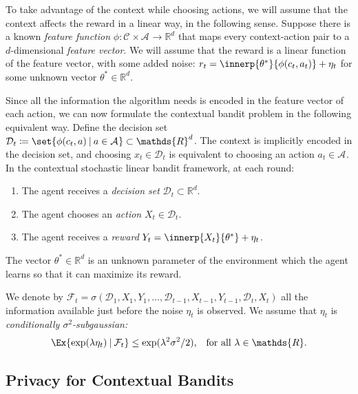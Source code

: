 \documentclass{article}
\newcommand{\defeq}{\coloneq}
\newcommand{\Real}{\mathds{R}}
\newcommand\given[1][\delimsize]{%
  \providecommand{\delimsize}{}
  \nonscript\:#1\vert\allowbreak\nonscript\:\mathopen{}
}
\newcommand{\Aset}[1]{\mathcal{A}_{#1}}
\newcommand{\Dset}[1]{\mathcal{D}_{#1}}
\newcommand{\Cset}[1]{\mathcal{C}_{#1}}
\begin{document}
To take advantage of the context while choosing actions, we will
assume that the context affects the reward in a linear way, in the
following sense.  Suppose there is a known \emph{feature function}
$\phi:\Cset{}\times\Aset{}\to\Real^d$ that maps every context-action
pair to a $d$-dimensional \emph{feature vector}.  We will assume that
the reward is a linear function of the feature vector, with some added
noise: $r_t = \innerp{\theta^*}{\phi(c_t,a_t)} + \eta_t$ for some
unknown vector $\theta^*\in\Real^d$.

Since all the information the algorithm needs is encoded in the
feature vector of each action, we can now formulate the contextual
bandit problem in the following equivalent way.  Define the decision
set
$\Dset{t} \defeq \set{\phi(c_t,a)\given a\in\Aset{}} \subset \Real^d$.
The context is implicitly encoded in the decision set, and choosing
$x_t\in\Dset{t}$ is equivalent to choosing an action $a_t\in\Aset{}$.
In the contextual stochastic linear bandit framework, at each round:
\begin{enumerate}
\item The agent receives a \emph{decision set} $\mathcal{D}_t \subset
  \Real^d$.
\item The agent chooses an \emph{action} $X_t \in \mathcal{D}_t$.
\item The agent receives a \emph{reward} $Y_t = \innerp{X_t}{\theta^*} + \eta_t$.
\end{enumerate}
The vector $\theta^*\in\Real^d$ is an unknown parameter of the
environment which the agent learns so that it can maximize its reward.

\begin{assumption}\label{assumption:subgaussian-noise}
  We denote by
  $\mathcal{F}_t =
  \sigma(\mathcal{D}_1,X_1,Y_1,\dotsc,\mathcal{D}_{t-1},X_{t-1},Y_{t-1},\mathcal{D}_t,X_t)$
  all the information available just before the noise $\eta_t$ is
  observed.  We assume that $\eta_t$ is \emph{conditionally
    $\sigma^2$-subgaussian:}
  \begin{align*}
    \Ex{\exp(\lambda\eta_t)\given \mathcal{F}_t} &\le \exp(\lambda^2\sigma^2/2),
    &\text{for all } \lambda\in\Real.
  \end{align*}
\end{assumption}

\subsection{Privacy for Contextual Bandits}
\end{document}

